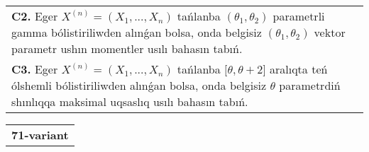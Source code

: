 \documentclass{article}
\begin{document}
\begin{tabular}{m{17cm}}
 \\
\textbf{C2.} 
Eger \(X^{(n)} = \left( X_{1},...,X_{n} \right)\) tańlanba \(\left( \theta_{1},\theta_{2} \right)\) parametrli gamma bólistiriliwden alınǵan bolsa, onda belgisiz \(\left( \theta_{1},\theta_{2} \right)\) vektor parametr ushın momentler usılı bahasın tabıń.
 \\
\textbf{C3.} 
Eger \(X^{(n)} = \left( X_{1},...,X_{n} \right)\) tańlanba \(\lbrack\theta,\theta + 2\rbrack\) aralıqta teń ólshemli bólistiriliwden alınǵan bolsa, onda belgisiz \(\theta\) parametrdiń shınlıqqa maksimal uqsaslıq usılı bahasın tabıń.
 \\

\end{tabular}
\vspace{1cm}


\begin{tabular}{m{17cm}}
\textbf{71-variant}
\newline


\end{tabular}
\end{document}
